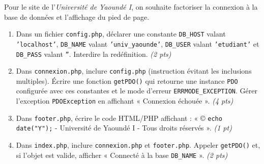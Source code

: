 \documentclass[11pt]{article}
\begin{document}
\begin{exercice}
Pour le site de l'\textit{Université de Yaoundé I}, on souhaite factoriser la connexion à la base de données et l'affichage du pied de page.
\begin{enumerate}
    \item Dans un fichier \texttt{config.php}, déclarer une constante \texttt{DB\_HOST} valant \texttt{'localhost'}, \texttt{DB\_NAME} valant \texttt{'univ\_yaounde'}, \texttt{DB\_USER} valant \texttt{'etudiant'} et \texttt{DB\_PASS} valant \texttt{''}. Interdire la redéfinition. \textit{(2 pts)}
    \item Dans \texttt{connexion.php}, inclure \texttt{config.php} (instruction évitant les inclusions multiples). Écrire une fonction \texttt{getPDO()} qui retourne une instance \texttt{PDO} configurée avec ces constantes et le mode d'erreur \texttt{ERRMODE\_EXCEPTION}. Gérer l'exception \texttt{PDOException} en affichant « Connexion échouée ». \textit{(4 pts)}
    \item Dans \texttt{footer.php}, écrire le code HTML/PHP affichant : « © \texttt{echo date("Y");} - Université de Yaoundé I - Tous droits réservés ». \textit{(1 pt)}
    \item Dans \texttt{index.php}, inclure \texttt{connexion.php} et \texttt{footer.php}. Appeler \texttt{getPDO()} et, si l'objet est valide, afficher « Connecté à la base \texttt{DB\_NAME} ». \textit{(2 pts)}
\end{enumerate}
\end{exercice}
\end{document}

